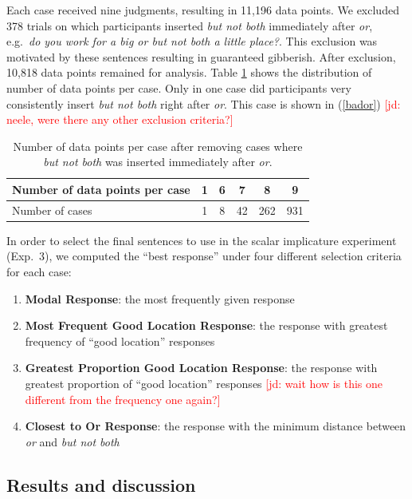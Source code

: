 \documentclass[11pt,letterpaper]{article}
\newcommand{\jd}[1]{\textcolor{Red}{[jd: #1]}}
\newcommand{\eref}[1]{(\ref{#1})}
\newcommand{\tableref}[1]{Table \ref{#1}}
\begin{document}
Each case received nine judgments, resulting in 11,196 data points. We excluded 378 trials on which participants inserted  \emph{but not both} immediately after \emph{or}, e.g.~\emph{do you work for a big or but not both a little place?}. This exclusion was motivated by these sentences resulting in guaranteed gibberish. After exclusion, 10,818 data points remained for analysis. \tableref{tab:casehist} shows the distribution of number of data points per case.  Only in one case did participants very consistently insert  \emph{but not both} right after \emph{or}. This case is shown in \eref{bador} \jd{neele, were there any other exclusion criteria?}

\begin{table}
\caption{Number of data points per case after removing cases where  \emph{but not both} was inserted immediately after \emph{or}.}
\begin{tabular}{l c c c c c}
\toprule
Number of data points per case &  1 &   6 &   7 &   8 &   9 \\
\midrule
Number of cases &  1 &  8 & 42 & 262 & 931 \\
\bottomrule
\end{tabular}
\label{tab:casehist}
\end{table}

\begin{exe}
	\ex\label{bador}  
\end{exe}

In order to select the final sentences to use in the scalar implicature experiment (Exp.~3), we computed the ``best response'' under four different selection criteria for each case:

\begin{enumerate}
	\item \textbf{Modal Response}: the most frequently given response
	\item \textbf{Most Frequent Good Location Response}: the response with greatest frequency of ``good location'' responses
	\item \textbf{Greatest Proportion Good Location Response}: the response with greatest proportion of ``good location'' responses \jd{wait how is this one different from the frequency one again?}
	\item \textbf{Closest to Or Response}: the response with the minimum distance between \emph{or} and \emph{but not both}
\end{enumerate}

\subsection{Results and discussion} 
\end{document}
